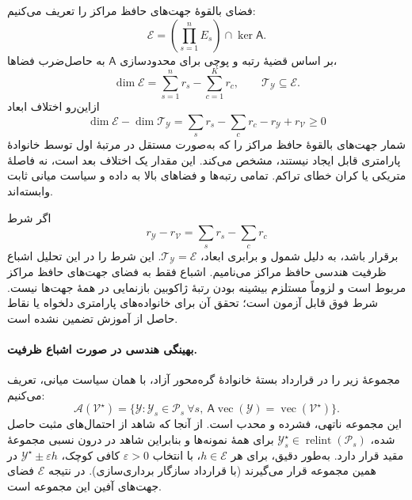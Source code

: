 فضای بالقوهٔ جهت‌های حافظ مراکز را تعریف می‌کنیم:
\begin{equation}\label{cmp:eq:ch3-geometry-parametric-base-center-direction-space}
\mathcal E=\left(\prod_{s=1}^nE_s\right)\cap\ker\mathsf A.
\end{equation}
بر اساس قضیهٔ رتبه و پوچی برای محدودسازی $\mathsf A$ به حاصل‌ضرب فضاها،
\begin{equation}\label{cmp:eq:ch3-geometry-parametric-base-center-direction-dim}
\dim\mathcal E=\sum_{s=1}^n r_s-\sum_{c=1}^K r_c,\qquad
\mathcal T_{\mathscr Y}\subseteq\mathcal E.
\end{equation}
ازاین‌رو اختلاف ابعاد
\begin{equation}\label{cmp:eq:ch3-geometry-parametric-capacity-gap}
\dim\mathcal E-\dim\mathcal T_{\mathscr Y}
=\sum_s r_s-\sum_c r_c-r_{\mathscr Y}+r_{\mathcal V}\ge0
\end{equation}
شمار جهت‌های بالقوهٔ حافظ مراکز را که به‌صورت مستقل در مرتبهٔ اول توسط خانوادهٔ پارامتری قابل ایجاد نیستند، مشخص می‌کند. این مقدار یک اختلاف بعد است، نه فاصلهٔ متریکی یا کران خطای تراکم. تمامی رتبه‌ها و فضاهای بالا به داده و سیاست میانی ثابت وابسته‌اند.

اگر شرط
\begin{equation}\label{cmp:eq:ch3-geometry-parametric-capacity-saturation}
r_{\mathscr Y}-r_{\mathcal V}=\sum_s r_s-\sum_c r_c
\end{equation}
برقرار باشد، به دلیل شمول و برابری ابعاد، $\mathcal T_{\mathscr Y}=\mathcal E$. این شرط را در این تحلیل اشباع ظرفیت هندسی حافظ مراکز می‌نامیم. اشباع فقط به فضای جهت‌های حافظ مراکز مربوط است و لزوماً مستلزم بیشینه بودن رتبهٔ ژاکوبین بازنمایی در همهٔ جهت‌ها نیست. شرط فوق قابل آزمون است؛ تحقق آن برای خانواده‌های پارامتری دلخواه یا نقاط حاصل از آموزش تضمین نشده است.

\paragraph{بهینگی هندسی در صورت اشباع ظرفیت.}
مجموعهٔ زیر را در قرارداد بستهٔ خانوادهٔ گره‌محور آزاد، با همان سیاست میانی، تعریف می‌کنیم:
\begin{equation}\label{cmp:eq:ch3-geometry-parametric-relaxed-center-arrangements}
\mathcal A(\mathcal V^\star)=
\{\mathscr Y:\mathscr Y_s\in\mathcal P_s\ \forall s,\ 
\mathsf A\operatorname{vec}(\mathscr Y)=\operatorname{vec}(\mathcal V^\star)\}.
\end{equation}
این مجموعه ناتهی، فشرده و محدب است. از آنجا که شاهد از احتمال‌های مثبت حاصل شده، $\mathscr Y_s^\star\in\operatorname{relint}(\mathcal P_s)$ برای همهٔ نمونه‌ها و بنابراین شاهد در درون نسبی مجموعهٔ مقید قرار دارد. به‌طور دقیق، برای هر $h\in\mathcal E$، با انتخاب $\varepsilon>0$ کافی کوچک، $\mathscr Y^\star\pm\varepsilon h$ در همین مجموعه قرار می‌گیرند (با قرارداد سازگار برداری‌سازی). در نتیجه $\mathcal E$ فضای جهت‌های آفین این مجموعه است.

